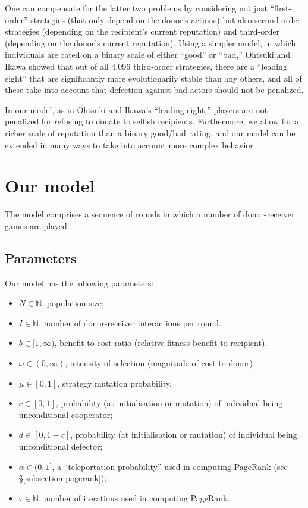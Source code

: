 \documentclass{amsart}
\begin{document}
One can compensate for the latter two problems by considering not just
``first-order'' strategies (that only depend on the donor's actions)
but also second-order strategies (depending on the recipient's current
reputation) and third-order (depending on the donor's current
reputation).  Using a simpler model, in which individuals are rated on
a binary scale of either ``good'' or ``bad,'' Ohtsuki and Ikawa
\cite{ohtsuki_how_2004} showed that out of all 4,096 third-order
strategies, there are a ``leading eight'' that are significantly more
evolutionarily stable than any others, and all of these take into
account that defection against bad actors should not be penalized.

In our model, as in Ohtsuki and Ikawa's ``leading eight,'' players are
not penalized for refusing to donate to selfish recipients.
Furthermore, we allow for a richer scale of reputation than a binary
good/bad rating, and our model can be extended in many ways to take
into account more complex behavior.


\section{Our model}
\label{section-model}

The model comprises a sequence of rounds in which a number of
donor-receiver games are played.

\subsection{Parameters}
\label{subsection-parameters}

Our model has the following parameters:

\begin{itemize}
\item $N \in \mathbb{N}$, population size;
\item $I \in \mathbb{N}$, number of donor-receiver interactions per round.
\item $b \in [1, \infty)$, benefit-to-cost ratio (relative fitness
  benefit to recipient).
\item $\omega \in (0, \infty)$, intensity of selection (magnitude of
  cost to donor).
\item $\mu \in [0, 1]$, strategy mutation probability.
\item $c \in [0, 1]$, probability (at initialisation or mutation) of individual
  being unconditional cooperator;
\item $d \in [0, 1-c]$, probability (at initialisation or mutation) of
  individual being unconditional defector;
\item $\alpha \in (0,1]$, a ``teleportation probability'' used in
  computing PageRank (see \S\ref{subsection-pagerank});
\item $\tau \in \mathbb{N}$, number of iterations used in computing
  PageRank.
\end{itemize}
\end{document}
